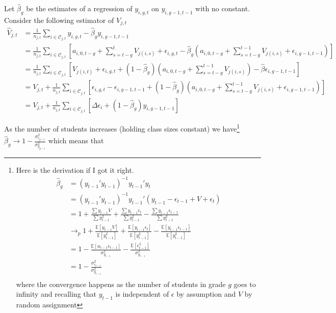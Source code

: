 \documentclass{article}
\theoremstyle{definition}
\theoremstyle{definition}
\begin{document}
Let $\hat{\beta}_g$ be the estimates of a regression of $y_{i,g,t}$ on $y_{i,g-1,t-1}$ with no constant. Consider the following estimator of $V_{j,t}$
\begin{align*}
\hat{V}_{j,t} &= \frac{1}{n_{j,t}}\sum_{i \in \mathcal{C}_{j,t}} y_{i,g,t} - \hat{\beta}_g y_{i,g-1,t-1} \\
              &= \frac{1}{n_{j,t}}\sum_{i \in \mathcal{C}_{j,t}} \left [ a_{i,0,t-g} + \sum_{s=t-g}^t  V_{j(i,s)} + \epsilon_{i,g,t} - \hat{\beta}_g  \left ( a_{i,0,t-g} + \sum_{s=t-g}^{t-1}  V_{j(i,s)} + \epsilon_{i,g-1,t-1}   \right )   \right ] \\
              &= \frac{1}{n_{j,t}}\sum_{i \in \mathcal{C}_{j,t}} \left [ V_{j(i,t)}  + \epsilon_{i,g,t} + \left (1 - \hat{\beta}_g  \right) \left ( a_{i,0,t-g} + \sum_{s=t-g}^{t-1}  V_{j(i,s)}    \right ) - \hat{\beta} \epsilon_{i,g-1,t-1} \right ] \\
              &= V_{j,t} + \frac{1}{n_{j,t}}\sum_{i \in \mathcal{C}_{j,t}}  \left [ \epsilon_{i,g,t} - \epsilon_{i,g-1,t-1} +  \left (1 - \hat{\beta}_g  \right) \left ( a_{i,0,t-g} + \sum_{s=t-g}^{t-1}  V_{j(i,s)}  + \epsilon_{i,g-1,t-1}  \right )  \right ] \\ 
              &= V_{j,t} + \frac{1}{n_{j,t}}\sum_{i \in \mathcal{C}_{j,t}}  \left [\Delta \epsilon_{i} +  \left (1 - \hat{\beta}_g  \right) y_{i,g-1,t-1} \right ] 
\end{align*}

 As the number of students increases (holding class sizes constant) we have\footnote{Here is the derivation if I got it right. 
\begin{align*}
    \hat{\beta}_g &=(y_{t-1}'y_{t-1})^{-1}y_{t-1}'y_t \\
                &=(y_{t-1}'y_{t-1})^{-1}y_{t-1}' \left (y_{t-1} - \epsilon_{t-1} + V + \epsilon_t \right ) \\
                &= 1 + \frac{\sum y_{t-1}V}{\sum y_{t-1}^2} + \frac{\sum y_{t-1} \epsilon_t}{\sum y_{t-1}^2}- \frac{\sum y_{t-1} \epsilon_{t-1}}{\sum y_{t-1}^2}\\
                & \to_p 1  + \frac{\mathbb{E}[y_{t-1}V]}{\mathbb{E}[y_{t-1}^2]} + \frac{\mathbb{E}[y_{t-1} \epsilon_t]}{\mathbb{E}[y_{t-1}^2]} - \frac{\mathbb{E}[y_{t-1} \epsilon_{t-1}]}{\mathbb{E}[y_{t-1}^2]}\\
                & = 1   - \frac{\mathbb{E}[a_{t-1} \epsilon_{t-1}]}{\sigma^2_{y_{t-1}}} - \frac{\mathbb{E}[\epsilon_{t-1}^2]}{\sigma^2_{y_{t-1}}} \\
                & = 1   - \frac{\sigma^2_{\epsilon_{t-1}}}{\sigma^2_{y_{t-1}}} \\
\end{align*}
\noindent where the convergence happens as the number of students in grade $g$ goes to infinity and recalling that $y_{t-1}$ is independent of $\epsilon$  by assumption and $V$ by random assignment 
 
 } $\hat{\beta}_g \to 1   - \frac{\sigma^2_{\epsilon_{g-1}}}{\sigma^2_{y_{g-1}}}$ which means that 
\end{document}
